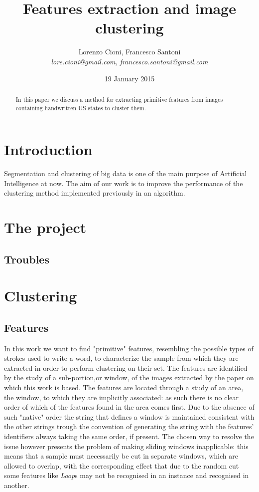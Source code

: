 \documentclass[a4paper,12pt]{article}
\title{\bf Features extraction and image clustering}
\date {19 January 2015}
\author{Lorenzo Cioni, Francesco Santoni\\\textit{{\small lore.cioni@gmail.com, francesco.santoni@gmail.com}}}
\begin{document}
\maketitle

\begin{abstract}
In this paper we discuss a method for extracting primitive features from images containing handwritten US states to cluster them.
\end{abstract}

\tableofcontents

\section{Introduction}
Segmentation and clustering of big data is one of the main purpose of Artificial Intelligence at now. 
The aim of our work is to improve the performance of the clustering method implemented previously in an algorithm.

\section{The project}

\subsection{Troubles}

\section{Clustering}



\subsection{Features}



In this work we want to find "primitive" features, resembling the possible types of strokes used to write a word, to characterize the sample from which they are extracted in order to perform clustering on their set.
The features are identified by the study of a sub-portion,or window, of the images extracted by the paper on which this work is based.
The features are located through a study of an area, the window, to which they are implicitly associated: as such there is no clear order of which of the features found in the area comes first.
Due to the absence of such "native" order the string that defines a window is maintained consistent with the other strings trough the convention of generating the string with the features' identifiers always taking the same order, if present.
The chosen way to resolve the issue however presents the problem of making sliding windows inapplicable: this means that a sample must necessarily be cut in separate windows, which are allowed to overlap, with the corresponding effect that due to the random cut some features like \textit{Loop}s may not be recognised in an instance and recognised in another. 
\end{document}
